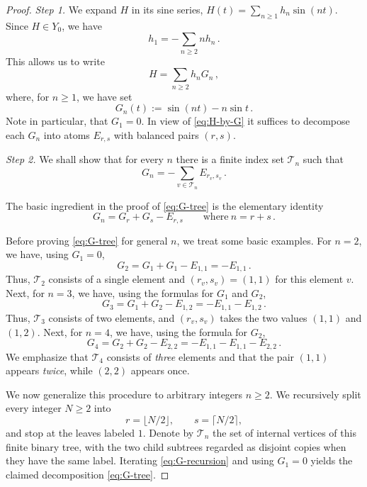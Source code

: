 \documentclass[10pt,a4paper]{amsart}
\begin{document}
\begin{proof}
\emph{Step 1.} We expand $H$ in its sine series, $H(t)=\sum_{n\geq1}h_n\sin(nt)$. Since $H\in Y_0$, we have
\[
 h_1=-\sum_{n\geq2}nh_n \,.
\]
This allows us to write
\begin{equation}\label{eq:H-by-G}
 H=\sum_{n\geq2}h_nG_n \,,
\end{equation}
where, for $n\geq1$, we have set
\[
 G_n(t):=\sin(nt)-n\sin t \,.
\]
Note in particular, that $G_1=0$. In view of \eqref{eq:H-by-G} it suffices to decompose each $G_n$ into atoms $E_{r,s}$ with balanced pairs $(r,s)$.

\medskip

\emph{Step 2.} We shall show that for every $n$ there is a finite index set $\mathcal T_n$ such that
\begin{equation}\label{eq:G-tree}
    G_n=-\sum_{v\in\mathcal T_n}E_{r_v,s_v} \,.
\end{equation}

The basic ingredient in the proof of \eqref{eq:G-tree} is the elementary identity
\begin{equation}\label{eq:G-recursion}
 G_n=G_r+G_s-E_{r,s}
 \qquad\text{where}\ n= r+s \,.
\end{equation}

Before proving \eqref{eq:G-tree} for general $n$, we treat some basic examples. For $n=2$, we have, using $G_1=0$,
$$
G_2 = G_1 + G_1 - E_{1,1} = - E_{1,1} \,.
$$
Thus, $\mathcal T_2$ consists of a single element and $(r_v,s_v)=(1,1)$ for this element $v$. Next, for $n=3$, we have, using the formulas for $G_1$ and $G_2$, 
$$
G_3 = G_1 + G_2 - E_{1,2} = - E_{1,1} - E_{1,2} \,.
$$
Thus, $\mathcal T_3$ consists of two elements, and $(r_v,s_v)$ takes the two values $(1,1)$ and $(1,2)$. Next, for $n=4$, we have, using the formula for $G_2$,
$$
G_4 = G_2 + G_2 - E_{2,2} = - E_{1,1} - E_{1,1} - E_{2,2} \,.
$$
We emphasize that $\mathcal T_4$ consists of \emph{three} elements and that the pair $(1,1)$ appears \emph{twice}, while $(2,2)$ appears once.

We now generalize this procedure to arbitrary integers $n\geq 2$. We recursively split every integer $N\geq2$ into
\[
 r=\lfloor N/2\rfloor,
 \qquad
 s=\lceil N/2\rceil,
\]
and stop at the leaves labeled $1$.  Denote by $\mathcal T_n$ the set of internal vertices of this finite binary tree, with the two child subtrees regarded as disjoint copies when they have the same label.  Iterating \eqref{eq:G-recursion} and using $G_1=0$ yields the claimed decomposition \eqref{eq:G-tree}.


\end{proof}
\end{document}
